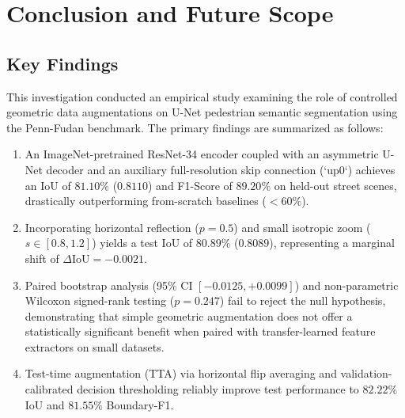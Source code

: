 \documentclass[10pt,a4paper]{article}
\begin{document}
\section{Conclusion and Future Scope}

\subsection{Key Findings}
This investigation conducted an empirical study examining the role of controlled geometric data augmentations on U-Net pedestrian semantic segmentation using the Penn-Fudan benchmark. The primary findings are summarized as follows:
\begin{enumerate}
    \item An ImageNet-pretrained ResNet-34 encoder coupled with an asymmetric U-Net decoder and an auxiliary full-resolution skip connection (`up0`) achieves an IoU of $81.10\%$ ($0.8110$) and F1-Score of $89.20\%$ on held-out street scenes, drastically outperforming from-scratch baselines ($<60\%$).
    \item Incorporating horizontal reflection ($p=0.5$) and small isotropic zoom ($s \in [0.8, 1.2]$) yields a test IoU of $80.89\%$ ($0.8089$), representing a marginal shift of $\Delta \text{IoU} = -0.0021$.
    \item Paired bootstrap analysis (95\% CI $[-0.0125, +0.0099]$) and non-parametric Wilcoxon signed-rank testing ($p = 0.247$) fail to reject the null hypothesis, demonstrating that simple geometric augmentation does not offer a statistically significant benefit when paired with transfer-learned feature extractors on small datasets.
    \item Test-time augmentation (TTA) via horizontal flip averaging and validation-calibrated decision thresholding reliably improve test performance to $82.22\%$ IoU and $81.55\%$ Boundary-F1.
\end{enumerate}
\end{document}
